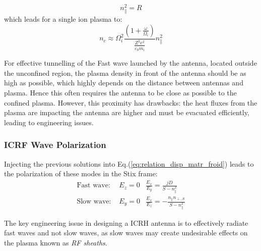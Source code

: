 \begin{equation}
n_\parallel^2 = R
\end{equation}
which leads for a single ion plasma to: 
\begin{equation}
n_c \approx \Omega_i^2 \frac{\left(1 + \frac{\omega}{\Omega_i}\right)}{\frac{Z^2 e^2}{\varepsilon_{0} m_i}}n_\parallel^2 
\end{equation}

For effective tunnelling of the Fast wave launched by the antenna, located outside the unconfined region, the
plasma density in front of the antenna should be as high as possible, which highly depends on the distance between antennas and plasma. Hence this often requires the antenna to be close as possible to the confined plasma. However, this proximity has drawbacks: the heat fluxes from the plasma are impacting the antenna are higher and must be evacuated efficiently, leading to engineering issues.


\subsubsection{ICRF Wave Polarization}
Injecting the previous solutions into Eq.(\ref{eq:relation_disp_matr_froid}) leads to the polarization of these modes in the Stix frame:
\begin{subequations}
	\begin{eqnarray}
		\mbox{Fast wave: } & E_z = 0 & \frac{E_x}{E_y}=\frac{j D}{S - n_\parallel^2} \\
		\mbox{Slow wave: } & E_y = 0 & \frac{E_x}{E_z}=- \frac{n_\parallel n_{\perp,S} }{S - n_\parallel^2}
	\end{eqnarray}
\end{subequations}

The key engineering issue in designing a ICRH antenna is to effectively radiate fast waves and not slow waves, as slow waves may create undesirable effects on the plasma known as \textit{RF sheaths}.

